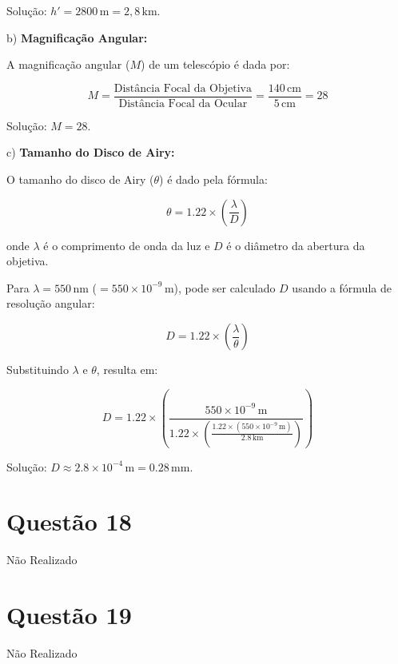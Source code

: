 \documentclass[a4paper, 12pt]{article}
\begin{document}
Solução: \(h' = 2800 \, \text{m} = 2,8 \, \text{km}\).

b) \textbf{Magnificação Angular:}

A magnificação angular (\(M\)) de um telescópio é dada por:

\[
M = \frac{\text{Distância Focal da Objetiva}}{\text{Distância Focal da Ocular}} = \frac{140 \, \text{cm}}{5 \, \text{cm}} = 28
\]

Solução: \(M = 28\).

c) \textbf{Tamanho do Disco de Airy:}

O tamanho do disco de Airy (\(\theta\)) é dado pela fórmula:

\[
\theta = 1.22 \times \left( \frac{\lambda}{D} \right)
\]

onde \(\lambda\) é o comprimento de onda da luz e \(D\) é o diâmetro da abertura da objetiva. 

Para \(\lambda = 550 \, \text{nm}\) (\(= 550 \times 10^{-9} \, \text{m}\)), pode ser calculado \(D\) usando a fórmula de resolução angular:

\[
D = 1.22 \times \left( \frac{\lambda}{\theta} \right)
\]

Substituindo \(\lambda\) e \(\theta\), resulta em:

\[
D = 1.22 \times \left( \frac{550 \times 10^{-9} \, \text{m}}{1.22 \times \left( \frac{1.22 \times (550 \times 10^{-9} \, \text{m})}{2.8 \, \text{km}} \right)} \right)
\]

Solução: \(D \approx 2.8 \times 10^{-4} \, \text{m} = 0.28 \, \text{mm}\).

\section*{Questão 18}
Não Realizado

\section*{Questão 19}
Não Realizado
\end{document}

